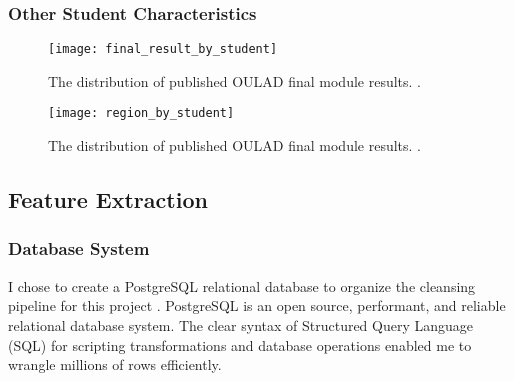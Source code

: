 \documentclass{article}
\begin{document}
            
            \subsubsection{Other Student Characteristics}
            
            \begin{figure}
                \centering
                \texttt{[image: final\_result\_by\_student]}
                \caption{The distribution of published OULAD final module results. \cite{oulad}.}
                \label{fig:final_result_by_student}
            \end{figure}
            \begin{figure}
                \centering
                \texttt{[image: region\_by\_student]}
                \caption{The distribution of published OULAD final module results. \cite{oulad}.}
                \label{fig:region_by_student}
            \end{figure}
        
        \subsection{Feature Extraction}
        
            \subsubsection{Database System}
                I chose to create a PostgreSQL relational database to organize the cleansing pipeline for this project \cite{postgresql}.
                PostgreSQL is an open source, performant, and reliable relational database system. 
                The clear syntax of Structured Query Language (SQL) for scripting transformations 
                and database operations enabled me to wrangle millions of rows efficiently.
      
\end{document}
